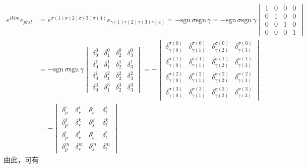 \begin{align*}
	e^{iklm}e_{prst} & = e^{\sigma(1)\sigma(2)\sigma(3)\sigma(4)} e_{\gamma(1)\gamma(2)\gamma(3)\gamma(4)} = -\mathrm{sgn}\,\sigma \mathrm{sgn}\,\gamma = -\mathrm{sgn}\,\sigma \mathrm{sgn}\,\gamma \begin{vmatrix} 1 & 0 & 0 & 0 \\ 0 & 1 & 0 & 0 \\ 0 & 0 & 1 & 0 \\ 0 & 0 & 0 & 1 \end{vmatrix} \\
	& = -\mathrm{sgn}\,\sigma \mathrm{sgn}\,\gamma \begin{vmatrix} \delta^0_0 & \delta^0_1 & \delta^0_2 & \delta^0_3 \\ \delta^1_0 & \delta^1_1 & \delta^1_2 & \delta^1_3 \\ \delta^1_0 & \delta^2_1 & \delta^2_2 & \delta^2_3 \\ \delta^3_0 & \delta^3_1 & \delta^3_2 & \delta^3_3 \end{vmatrix} = - \begin{vmatrix} \delta^{\sigma(0)}_{\gamma(0)} & \delta^{\sigma(0)}_{\gamma(1)} & \delta^{\sigma(0)}_{\gamma(2)} & \delta^{\sigma(0)}_{\gamma(3)} \\ \delta^{\sigma(1)}_{\gamma(0)} & \delta^{\sigma(1)}_{\gamma(1)} & \delta^{\sigma(1)}_{\gamma(2)} & \delta^{\sigma(1)}_{\gamma(3)} \\ \delta^{\sigma(2)}_{\gamma(0)} & \delta^{\sigma(2)}_{\gamma(1)} & \delta^{\sigma(2)}_{\gamma(2)} & \delta^{\sigma(2)}_{\gamma(3)} \\ \delta^{\sigma(3)}_{\gamma(0)} & \delta^{\sigma(3)}_{\gamma(1)} & \delta^{\sigma(3)}_{\gamma(2)} & \delta^{\sigma(3)}_{\gamma(3)} \end{vmatrix} \\
	& = -\begin{vmatrix} \delta^i_p & \delta^i_r & \delta^i_s & \delta^i_t \\ \delta^k_p & \delta^k_r & \delta^k_s & \delta^k_t \\ \delta^l_p & \delta^l_r & \delta^l_s & \delta^l_t \\ \delta^m_p & \delta^m_r & \delta^m_s & \delta^m_t \end{vmatrix}
\end{align*}
由此，可有
